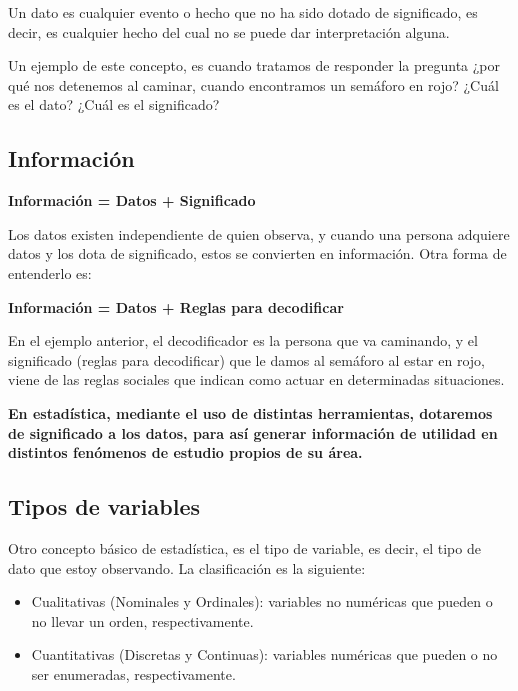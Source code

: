 \documentclass[
]{book}
\providecommand{\tightlist}{%
  \setlength{\itemsep}{0pt}\setlength{\parskip}{0pt}}
\theoremstyle{definition}
\theoremstyle{definition}
\theoremstyle{definition}
\theoremstyle{definition}
\theoremstyle{remark}
\begin{document}
Un dato es cualquier evento o hecho que no ha sido dotado de significado, es decir, es cualquier hecho del cual no se puede dar interpretación alguna.

Un ejemplo de este concepto, es cuando tratamos de responder la pregunta ¿por qué nos detenemos al caminar, cuando encontramos un semáforo en rojo? ¿Cuál es el dato? ¿Cuál es el significado?

\hypertarget{informaciuxf3n}{%
\subsection*{Información}\label{informaciuxf3n}}

\textbf{Información = Datos + Significado}

Los datos existen independiente de quien observa, y cuando una persona adquiere datos y los dota de significado, estos se convierten en información. Otra forma de entenderlo es:

\textbf{Información = Datos + Reglas para decodificar}

En el ejemplo anterior, el decodificador es la persona que va caminando, y el significado (reglas para decodificar) que le damos al semáforo al estar en rojo, viene de las reglas sociales que indican como actuar en determinadas situaciones.

\textbf{En estadística, mediante el uso de distintas herramientas, dotaremos de significado a los datos, para así generar información de utilidad en distintos fenómenos de estudio propios de su área.}

\hypertarget{tipos-de-variables}{%
\subsection*{Tipos de variables}\label{tipos-de-variables}}

Otro concepto básico de estadística, es el tipo de variable, es decir, el tipo de dato que estoy observando. La clasificación es la siguiente:

\begin{itemize}
\tightlist
\item
  Cualitativas (Nominales y Ordinales): variables no numéricas que pueden o no llevar un orden, respectivamente.
\item
  Cuantitativas (Discretas y Continuas): variables numéricas que pueden o no ser enumeradas, respectivamente.
\end{itemize}
\end{document}
